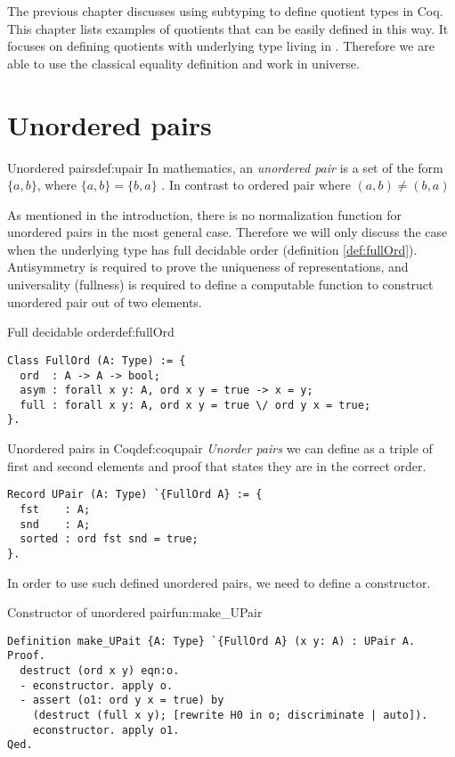 The previous chapter discusses using subtyping to define quotient types in Coq. This chapter lists examples of quotients that can be easily defined in this way. It focuses on defining quotients with underlying type living in . Therefore we are able to use the classical equality definition and work in  universe.
\section{Unordered pairs}
\begin{defi}{Unordered pairs}{def:upair}
In mathematics, an \emph{unordered pair} is a set of the form $\{a, b\}$, where $\{a, b\} = \{b, a\}$ \cite{SetTheorey}. In contrast to ordered pair where $(a, b) \not= (b, a)$
\end{defi}
As mentioned in the introduction, there is no normalization function for unordered pairs in the most general case. Therefore we will only discuss the case when the underlying type has full decidable order (definition \ref{def:fullOrd}). Antisymmetry is required to prove the uniqueness of representations, and universality (fullness) is required to define a computable function to construct unordered pair out of two elements.
\begin{defi}{Full decidable order}{def:fullOrd}
\begin{verbatim}
Class FullOrd (A: Type) := {
  ord  : A -> A -> bool;
  asym : forall x y: A, ord x y = true -> x = y;
  full : forall x y: A, ord x y = true \/ ord y x = true;
}.
\end{verbatim}
\end{defi}
\begin{defi}{Unordered pairs in Coq}{def:coqupair}
\emph{Unorder pairs} we can define as a triple of first and second elements and proof that states they are in the correct order.
\begin{verbatim}
Record UPair (A: Type) `{FullOrd A} := {
  fst    : A;
  snd    : A;
  sorted : ord fst snd = true;
}.
\end{verbatim}
\end{defi}
In order to use such defined unordered pairs, we need to define a constructor.
\begin{func}{Constructor of unordered pair}{fun:make_UPair}
\begin{verbatim}
Definition make_UPait {A: Type} `{FullOrd A} (x y: A) : UPair A.
Proof.
  destruct (ord x y) eqn:o. 
  - econstructor. apply o.
  - assert (o1: ord y x = true) by
    (destruct (full x y); [rewrite H0 in o; discriminate | auto]).
    econstructor. apply o1.
Qed.
\end{verbatim}
\end{func}

